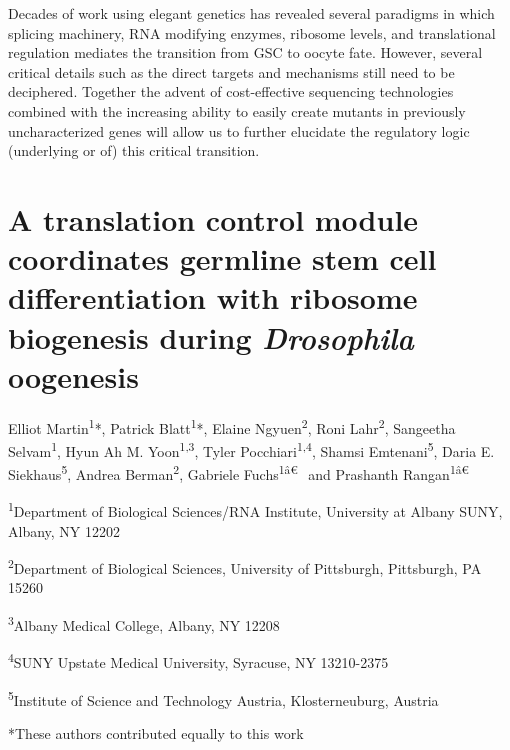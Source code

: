 \documentclass[12pt,twoside]{reedthesis}
\begin{document}
Decades of work using elegant genetics has revealed several paradigms in
which splicing machinery, RNA modifying enzymes, ribosome levels, and
translational regulation mediates the transition from GSC to oocyte
fate. However, several critical details such as the direct targets and
mechanisms still need to be deciphered. Together the advent of
cost-effective sequencing technologies combined with the increasing
ability to easily create mutants in previously uncharacterized genes
will allow us to further elucidate the regulatory logic (underlying or
of) this critical transition.

\hypertarget{a-translation-control-module-coordinates-germline-stem-cell-differentiation-with-ribosome-biogenesis-during-drosophila-oogenesis}{%
\chapter{\texorpdfstring{A translation control module coordinates germline stem cell differentiation with ribosome biogenesis during \emph{Drosophila} oogenesis}{A translation control module coordinates germline stem cell differentiation with ribosome biogenesis during Drosophila oogenesis}}\label{a-translation-control-module-coordinates-germline-stem-cell-differentiation-with-ribosome-biogenesis-during-drosophila-oogenesis}}

Elliot Martin\textsuperscript{1}*, Patrick Blatt\textsuperscript{1}*, Elaine Ngyuen\textsuperscript{2}, Roni Lahr\textsuperscript{2},
Sangeetha Selvam\textsuperscript{1}, Hyun Ah M. Yoon\textsuperscript{1,3}, Tyler Pocchiari\textsuperscript{1,4}, Shamsi
Emtenani\textsuperscript{5}, Daria E. Siekhaus\textsuperscript{5}, Andrea Berman\textsuperscript{2}, Gabriele Fuchs\textsuperscript{1â€~}
and Prashanth Rangan\textsuperscript{1â€~}

\textsuperscript{1}Department of Biological Sciences/RNA Institute, University at Albany
SUNY, Albany, NY 12202

\textsuperscript{2}Department of Biological Sciences, University of Pittsburgh,
Pittsburgh, PA 15260

\textsuperscript{3}Albany Medical College, Albany, NY 12208

\textsuperscript{4}SUNY Upstate Medical University, Syracuse, NY 13210-2375

\textsuperscript{5}Institute of Science and Technology Austria, Klosterneuburg, Austria

*These authors contributed equally to this work
\end{document}
